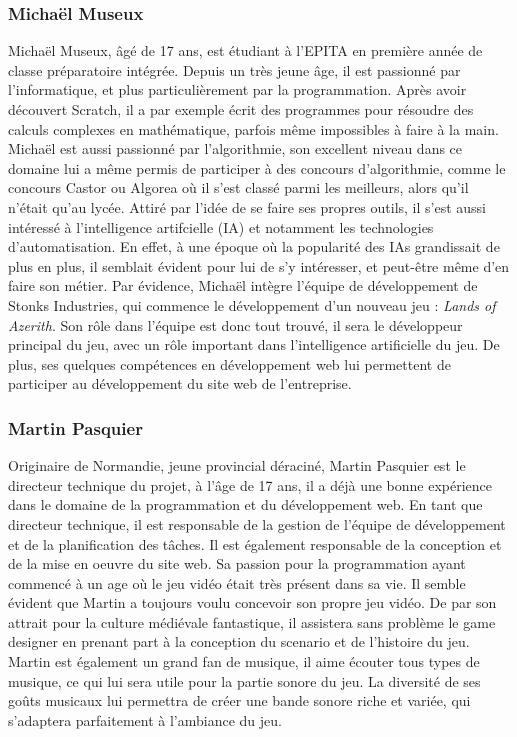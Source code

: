 \subsubsection{Michaël Museux}

Michaël Museux, âgé de 17 ans, est étudiant à l'EPITA en première année de classe préparatoire intégrée.
Depuis un très jeune âge, il est passionné par l'informatique, et plus particulièrement par la programmation.
Après avoir découvert Scratch, il a par exemple écrit des programmes pour résoudre des calculs complexes en mathématique, parfois même impossibles à faire à la main. Michaël est aussi passionné par l'algorithmie, son excellent niveau dans ce domaine lui a même permis de participer à des concours d'algorithmie, comme le concours Castor ou Algorea où il s'est classé parmi les meilleurs, alors qu'il n'était qu'au lycée.
Attiré par l'idée de se faire ses propres outils, il s'est aussi intéressé à l'intelligence artifcielle (IA) et notamment les technologies d'automatisation.
En effet, à une époque où la popularité des IAs grandissait de plus en plus, il semblait évident pour lui de s'y intéresser, et peut-être même d'en faire son métier.
Par évidence, Michaël intègre l'équipe de développement de Stonks Industries, qui commence le développement d'un nouveau jeu : \textit{Lands of Azerith}. 
Son rôle dans l'équipe est donc tout trouvé, il sera le développeur principal du jeu, avec un rôle important dans l'intelligence artificielle du jeu. 
De plus, ses quelques compétences en développement web lui permettent de participer au développement du site web de l'entreprise.

\subsubsection{Martin Pasquier}

Originaire de Normandie, jeune provincial déraciné, Martin Pasquier est le directeur technique du projet, à l'âge de 17 ans, il a déjà une bonne expérience dans le domaine de la programmation et du développement web.
En tant que directeur technique, il est responsable de la gestion de l'équipe de développement et de la planification des tâches. Il est également responsable de la conception et de la mise en oeuvre du site web.
Sa passion pour la programmation ayant commencé à un age où le jeu vidéo était très présent dans sa vie. Il semble évident que Martin a toujours voulu concevoir son propre jeu vidéo.
De par son attrait pour la culture médiévale fantastique, il assistera sans problème le game designer en prenant part à la conception du scenario et de l'histoire du jeu.
Martin est également un grand fan de musique, il aime écouter tous types de musique, ce qui lui sera utile pour la partie sonore du jeu.
La diversité de ses goûts musicaux lui permettra de créer une bande sonore riche et variée, qui s'adaptera parfaitement à l'ambiance du jeu.

